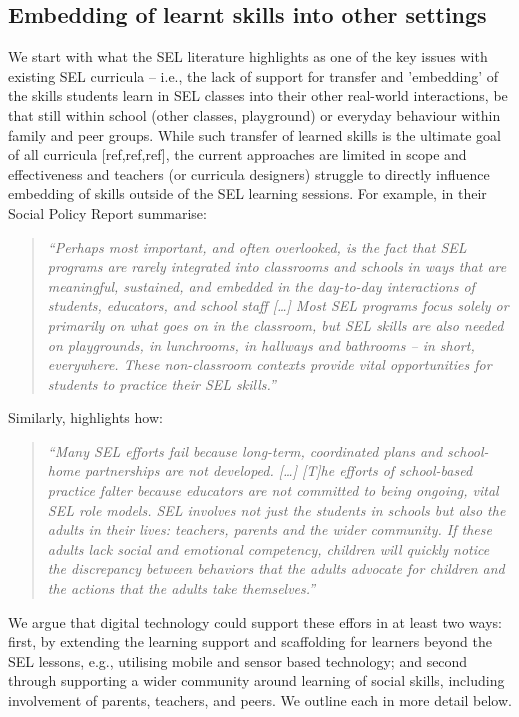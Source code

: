 \documentclass[prodmode,acmtochi]{acmsmall}
\newcommand{\qqq}[1]{\begin{quotation} \emph{``#1''} \end{quotation}}
\begin{document}
\subsection{Embedding of learnt skills into other settings}
\label{sec:embedding}
We start with what the SEL literature highlights as one of the key issues with existing SEL curricula -- i.e., the lack of support for transfer and 'embedding' of the skills students learn in SEL classes into their other real-world interactions, be that still within school (other classes, playground) or everyday behaviour within family and peer groups. 
%
While such transfer of learned skills is the ultimate goal of all curricula [ref,ref,ref], the current approaches are limited in scope and effectiveness and teachers (or curricula designers) struggle to directly influence embedding of skills outside of the SEL learning sessions.
%
For example, in their Social Policy Report  summarise: \qqq{Perhaps most important, and often overlooked, is the fact that SEL programs are rarely integrated into classrooms and schools in ways that are meaningful, sustained, and embedded in the day-to-day interactions of students, educators, and school staff [\dots] Most SEL programs focus solely or primarily on what goes on in the classroom, but SEL skills are also needed on playgrounds, in lunchrooms, in hallways and bathrooms -- in short, everywhere. These non-classroom contexts provide vital opportunities for students to practice their SEL skills.}
%
Similarly,  highlights how: \qqq{Many SEL efforts fail because long-term, coordinated plans and school-home partnerships are not developed. [\dots] [T]he efforts of school-based practice falter because educators are not committed to being ongoing, vital SEL role models. SEL involves not just the students in schools but also the adults in their lives: teachers, parents and the wider community. If these adults lack social and emotional competency, children will quickly notice the discrepancy between behaviors that the adults advocate for children and the actions that the adults take themselves.}



We argue that digital technology could support these effors in at least two ways: first, by extending the learning support and scaffolding for learners beyond the SEL lessons, e.g., utilising mobile and sensor based technology; and second through supporting a wider community around learning of social skills, including involvement of parents, teachers, and peers. We outline each in more detail below.
\end{document}
